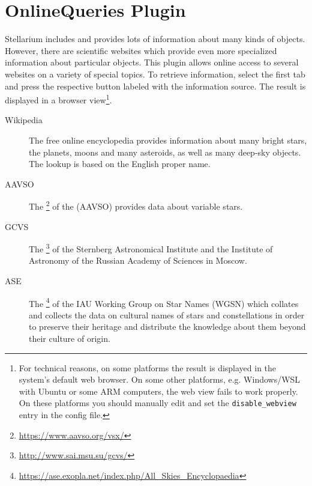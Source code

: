 % 

\newpage
\section{OnlineQueries Plugin}
\label{sec:plugins:OnlineQueries}

Stellarium includes and provides lots of information about many kinds
of objects. However, there are scientific websites which provide even
more specialized information about particular objects. This plugin 
\citep{Zotti-etal:SEAC2021} allows online access to several websites on a
variety of special topics. To retrieve information, select the
first tab and press the respective button labeled with the information source. 
The result is displayed in a browser view\footnote{%
  For technical reasons, on some platforms the
  result is displayed in the system's default web browser.  On some
  other platforms, e.g. Windows/WSL with Ubuntu or some ARM computers, the
  web view fails to work properly.  On these platforms you should
  manually edit  and set the
  \texttt{disable\_webview} entry in the config file.}.

\begin{description}
\item[Wikipedia] The free online encyclopedia provides information
  about many bright stars, the planets, moons and many asteroids, as
  well as many deep-sky objects. The lookup is based on the English
  proper name.
\item[AAVSO] The \footnote{\url{https://www.aavso.org/vsx/}} of the
   (AAVSO)
  provides data about variable stars.
\item[GCVS] The \footnote{\url{http://www.sai.msu.su/gcvs/}} of the Sternberg
  Astronomical Institute and the Institute of Astronomy of the Russian
  Academy of Sciences in Moscow.
\item[ASE] The %
  \footnote{\url{https://ase.exopla.net/index.php/All_Skies_Encyclopaedia}} 
  of the IAU Working Group on Star Names (WGSN) which collates and collects 
  the data on cultural names of stars and constellations in order to preserve 
  their heritage and distribute the knowledge about them beyond their culture of origin.
\end{description}

